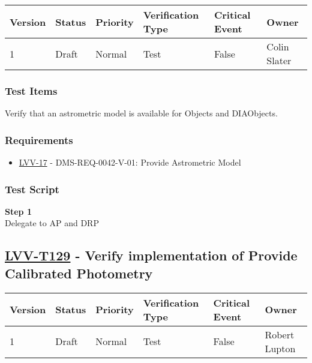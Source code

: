\begin{longtable}[]{@{}llllll@{}}
\toprule
Version & Status & Priority & Verification Type & Critical Event &
Owner\tabularnewline
\midrule
\endhead
1 & Draft & Normal & Test & False & Colin Slater\tabularnewline
\bottomrule
\end{longtable}

\subsubsection{Test Items}\label{test-items-6}

Verify that an astrometric model is available for Objects and
DIAObjects.

\subsubsection{Requirements}\label{requirements-6}

\begin{itemize}
\tightlist
\item
  \href{https://jira.lsstcorp.org/browse/LVV-17}{LVV-17} -
  DMS-REQ-0042-V-01: Provide Astrometric Model
\end{itemize}

\subsubsection{Test Script}\label{test-script-6}

\textbf{Step 1}\\
Delegate to AP and DRP\\[2\baselineskip]

\hypertarget{lvv-t129---verify-implementation-of-provide-calibrated-photometry}{\subsection{\texorpdfstring{\href{https://jira.lsstcorp.org/secure/Tests.jspa\#/testCase/LVV-T129}{LVV-T129}
- Verify implementation of Provide Calibrated
Photometry}{LVV-T129 - Verify implementation of Provide Calibrated Photometry}}\label{lvv-t129---verify-implementation-of-provide-calibrated-photometry}}

\begin{longtable}[]{@{}llllll@{}}
\toprule
Version & Status & Priority & Verification Type & Critical Event &
Owner\tabularnewline
\midrule
\endhead
1 & Draft & Normal & Test & False & Robert Lupton\tabularnewline
\bottomrule
\end{longtable}

